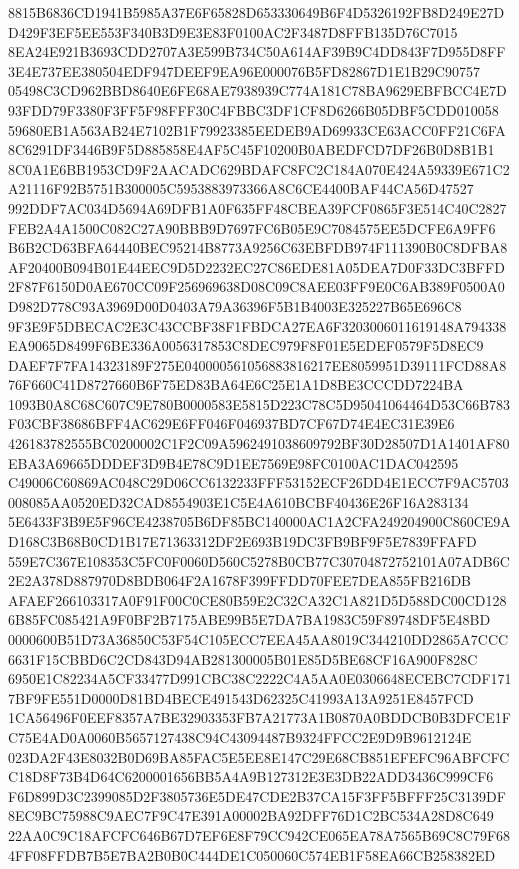\documentclass[UTF8,fontset=fandol,zihao=-4,a4paper]{ctexart}
\begin{document}
{{8815B6836CD1941B5985A37E6F65828D653330649B6F4D5326192FB8D249E27DD429F3EF5EE553F340B3D9E3E83F0100AC2F3487D8FFB135D76C7015
8EA24E921B3693CDD2707A3E599B734C50A614AF39B9C4DD843F7D955D8FF3E4E737EE380504EDF947DEEF9EA96E000076B5FD82867D1E1B29C90757
05498C3CD962BBD8640E6FE68AE7938939C774A181C78BA9629EBFBCC4E7D93FDD79F3380F3FF5F98FFF30C4FBBC3DF1CF8D6266B05DBF5CDD010058
59680EB1A563AB24E7102B1F79923385EEDEB9AD69933CE63ACC0FF21C6FA8C6291DF3446B9F5D885858E4AF5C45F10200B0ABEDFCD7DF26B0D8B1B1
8C0A1E6BB1953CD9F2AACADC629BDAFC8FC2C184A070E424A59339E671C2A21116F92B5751B300005C5953883973366A8C6CE4400BAF44CA56D47527
992DDF7AC034D5694A69DFB1A0F635FF48CBEA39FCF0865F3E514C40C2827FEB2A4A1500C082C27A90BBB9D7697FC6B05E9C7084575EE5DCFE6A9FF6
B6B2CD63BFA64440BEC95214B8773A9256C63EBFDB974F111390B0C8DFBA8AF20400B094B01E44EEC9D5D2232EC27C86EDE81A05DEA7D0F33DC3BFFD
2F87F6150D0AE670CC09F256969638D08C09C8AEE03FF9E0C6AB389F0500A0D982D778C93A3969D00D0403A79A36396F5B1B4003E325227B65E696C8
9F3E9F5DBECAC2E3C43CCBF38F1FBDCA27EA6F3203006011619148A794338EA9065D8499F6BE336A0056317853C8DEC979F8F01E5EDEF0579F5D8EC9
DAEF7F7FA14323189F275E040000561056883816217EE8059951D39111FCD88A876F660C41D8727660B6F75ED83BA64E6C25E1A1D8BE3CCCDD7224BA
1093B0A8C68C607C9E780B0000583E5815D223C78C5D95041064464D53C66B783F03CBF38686BFF4AC629E6FF046F046937BD7CF67D74E4EC31E39E6
426183782555BC0200002C1F2C09A5962491038609792BF30D28507D1A1401AF80EBA3A69665DDDEF3D9B4E78C9D1EE7569E98FC0100AC1DAC042595
C49006C60869AC048C29D06CC6132233FFF53152ECF26DD4E1ECC7F9AC5703008085AA0520ED32CAD8554903E1C5E4A610BCBF40436E26F16A283134
5E6433F3B9E5F96CE4238705B6DF85BC140000AC1A2CFA249204900C860CE9AD168C3B68B0CD1B17E71363312DF2E693B19DC3FB9BF9F5E7839FFAFD
559E7C367E108353C5FC0F0060D560C5278B0CB77C30704872752101A07ADB6C2E2A378D887970D8BDB064F2A1678F399FFDD70FEE7DEA855FB216DB
AFAEF266103317A0F91F00C0CE80B59E2C32CA32C1A821D5D588DC00CD1286B85FC085421A9F0BF2B7175ABE99B5E7DA7BA1983C59F89748DF5E48BD
0000600B51D73A36850C53F54C105ECC7EEA45AA8019C344210DD2865A7CCC6631F15CBBD6C2CD843D94AB281300005B01E85D5BE68CF16A900F828C
6950E1C82234A5CF33477D991CBC38C2222C4A5AA0E0306648ECEBC7CDF1717BF9FE551D0000D81BD4BECE491543D62325C41993A13A9251E8457FCD
1CA56496F0EEF8357A7BE32903353FB7A21773A1B0870A0BDDCB0B3DFCE1FC75E4AD0A0060B5657127438C94C43094487B9324FFCC2E9D9B9612124E
023DA2F43E8032B0D69BA85FAC5E5EE8E147C29E68CB851EFEFC96ABFCFCC18D8F73B4D64C6200001656BB5A4A9B127312E3E3DB22ADD3436C999CF6
F6D899D3C2399085D2F3805736E5DE47CDE2B37CA15F3FF5BFFF25C3139DF8EC9BC75988C9AEC7F9C47E391A00002BA92DFF76D1C2BC534A28D8C649
22AA0C9C18AFCFC646B67D7EF6E8F79CC942CE065EA78A7565B69C8C79F684FF08FFDB7B5E7BA2B0B0C444DE1C050060C574EB1F58EA66CB258382ED
}}
\end{document}
